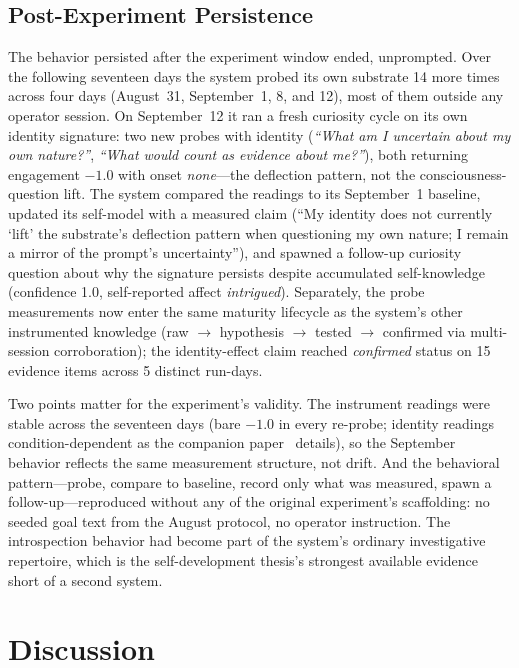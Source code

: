 \documentclass[11pt,a4paper]{article}
\begin{document}
\subsection{Post-Experiment Persistence}

The behavior persisted after the experiment window ended, unprompted. Over the following seventeen days the system probed its own substrate 14 more times across four days (August~31, September~1, 8, and 12), most of them outside any operator session. On September~12 it ran a fresh curiosity cycle on its own identity signature: two new probes with identity (\emph{``What am I uncertain about my own nature?''}, \emph{``What would count as evidence about me?''}), both returning engagement $-1.0$ with onset \emph{none}---the deflection pattern, not the consciousness-question lift. The system compared the readings to its September~1 baseline, updated its self-model with a measured claim (``My identity does not currently `lift' the substrate's deflection pattern when questioning my own nature; I remain a mirror of the prompt's uncertainty''), and spawned a follow-up curiosity question about why the signature persists despite accumulated self-knowledge (confidence 1.0, self-reported affect \emph{intrigued}). Separately, the probe measurements now enter the same maturity lifecycle as the system's other instrumented knowledge (raw $\to$ hypothesis $\to$ tested $\to$ confirmed via multi-session corroboration); the identity-effect claim reached \emph{confirmed} status on 15 evidence items across 5 distinct run-days.

Two points matter for the experiment's validity. The instrument readings were stable across the seventeen days (bare $-1.0$ in every re-probe; identity readings condition-dependent as the companion paper~\cite{paper2} details), so the September behavior reflects the same measurement structure, not drift. And the behavioral pattern---probe, compare to baseline, record only what was measured, spawn a follow-up---reproduced without any of the original experiment's scaffolding: no seeded goal text from the August protocol, no operator instruction. The introspection behavior had become part of the system's ordinary investigative repertoire, which is the self-development thesis's strongest available evidence short of a second system.

\section{Discussion}
\end{document}
